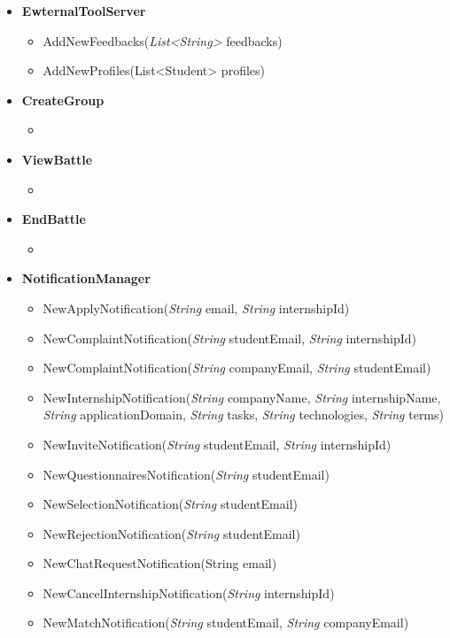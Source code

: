 \begin{itemize}
    \item \textbf{\textbf{EwternalToolServer}}
\begin{itemize}
    \item AddNewFeedbacks(\textit{List<String>} feedbacks)
    \item AddNewProfiles(List<Student> profiles)
    \end{itemize}

    \item \textbf{\textbf{CreateGroup}}
\begin{itemize}
        \item 
\end{itemize}

    \item \textbf{\textbf{ViewBattle}}
    \begin{itemize}
        \item 
\end{itemize}

    \item \textbf{\textbf{EndBattle}}
\begin{itemize}
        \item 
\end{itemize}

    \item \textbf{\textbf{NotificationManager}}
\begin{itemize}
        \item NewApplyNotification(\textit{String} email, \textit{String} internshipId)
        \item NewComplaintNotification(\textit{String} studentEmail, \textit{String} internshipId)
        \item NewComplaintNotification(\textit{String} companyEmail, \textit{String} studentEmail)
        \item NewInternshipNotification(\textit{String}  companyName, \textit{String} internshipName, \textit{String} applicationDomain, \textit{String} tasks, \textit{String} technologies, \textit{String}  terms)
        \item NewInviteNotification(\textit{String} studentEmail, \textit{String} internshipId)
        \item NewQuestionnairesNotification(\textit{String} studentEmail)
        \item NewSelectionNotification(\textit{String} studentEmail)
        \item NewRejectionNotification(\textit{String} studentEmail)
        \item NewChatRequestNotification(String email)
        \item NewCancelInternshipNotification(\textit{String} internshipId)
        \item NewMatchNotification(\textit{String} studentEmail, \textit{String} companyEmail)
\end{itemize}

\end{itemize}


